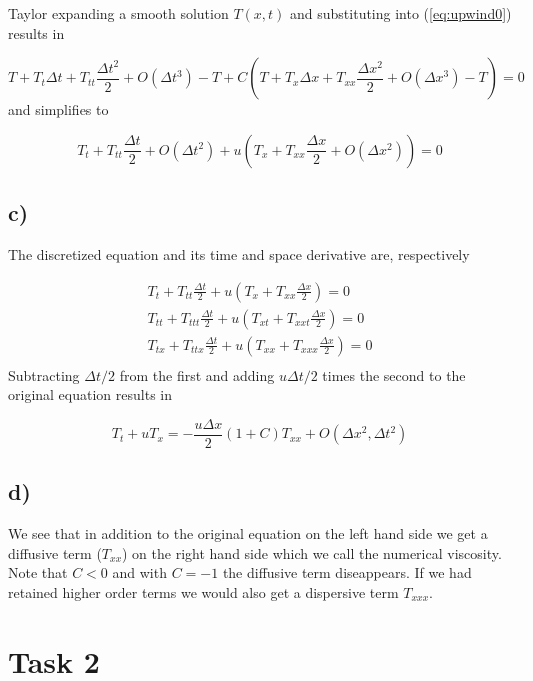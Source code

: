 \documentclass{article}
\begin{document}
Taylor expanding a smooth solution $T(x,t)$ and substituting into (\ref{eq:upwind0}) results in

\begin{equation}
 	T + T_t \Delta t + T_{tt}\frac{\Delta t^2}{2} +O(\Delta t^3) - T +	C(T + T_x \Delta x + T_{xx}  \frac{\Delta x^2}{2} + O(\Delta x^3)- T) = 0
\end{equation}
and simplifies to

\begin{equation}
 	T_t  + T_{tt}\frac{\Delta t}{2}  + O(\Delta t^2) +	u( T_x  + T_{xx}  \frac{\Delta x}{2} + O(\Delta x^2) ) =0
\end{equation}

\subsection{c)}

The discretized equation and its time and space derivative are, respectively

\begin{align}
	T_t  + T_{tt}\frac{\Delta t}{2} + 	u( T_x  + T_{xx}  \frac{\Delta x}{2} ) =0 \\
	T_{tt}  + T_{ttt}\frac{\Delta t}{2} +	u( T_{xt}  + T_{xxt}  \frac{\Delta x}{2} ) =0 \\
	T_{tx}  + T_{ttx}\frac{\Delta t}{2} +	u( T_{xx}  + T_{xxx}  \frac{\Delta x}{2} ) =0 \\
\end{align}
Subtracting $\Delta t/2$ from the first and adding $u\Delta t/2$ times the second to the original equation results in

\begin{equation}
T_t  + uT_{x} = -\frac{u\Delta x}{2} (1+ C)T_{xx} + O(\Delta x^2, \Delta t^2)
\end{equation}

\subsection{d)}

We see that in addition to the original equation on the left hand side we get a diffusive term ($T_{xx}$) on the right hand side which we call the numerical viscosity. Note that $C<0$ and with $C=-1$ the diffusive term diseappears. If we had retained higher order terms we would also get a dispersive term $T_{xxx}$.

\section{Task 2}
\end{document}
